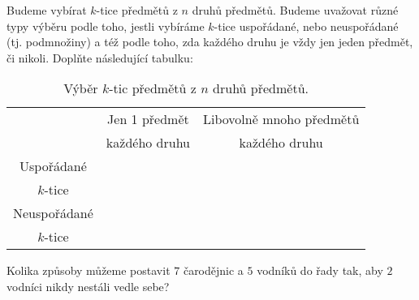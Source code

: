 \begin{exercise}
 Budeme vybírat $k$-tice předmětů z $n$ druhů předmětů. Budeme uvažovat různé
 typy výběru podle toho, jestli vybíráme $k$-tice uspořádané, nebo neuspořádané
 (tj. podmnožiny) a též podle toho, zda každého druhu je vždy jen jeden předmět,
 či nikoli. Doplňte následující tabulku:
 \begin{table}[H]
  \centering
  \begin{tabular}{c|c|c}
   & Jen 1 předmět & Libovolně mnoho předmětů\\
   & každého druhu & každého druhu\\
   \midrule
   Uspořádané& &\\
   $k$-tice& &\\
   \midrule
   Neuspořádané & &\\
   $k$-tice& &
  \end{tabular}
  \caption{Výběr $k$-tic předmětů z $n$ druhů předmětů.}
  \label{table:vyber-k-z-n}
 \end{table}
\end{exercise}

\begin{exercise}[těžké]
 Kolika způsoby můžeme postavit $7$ čarodějnic a $5$ vodníků do řady tak, aby
 $2$ vodníci nikdy nestáli vedle sebe?
\end{exercise}
